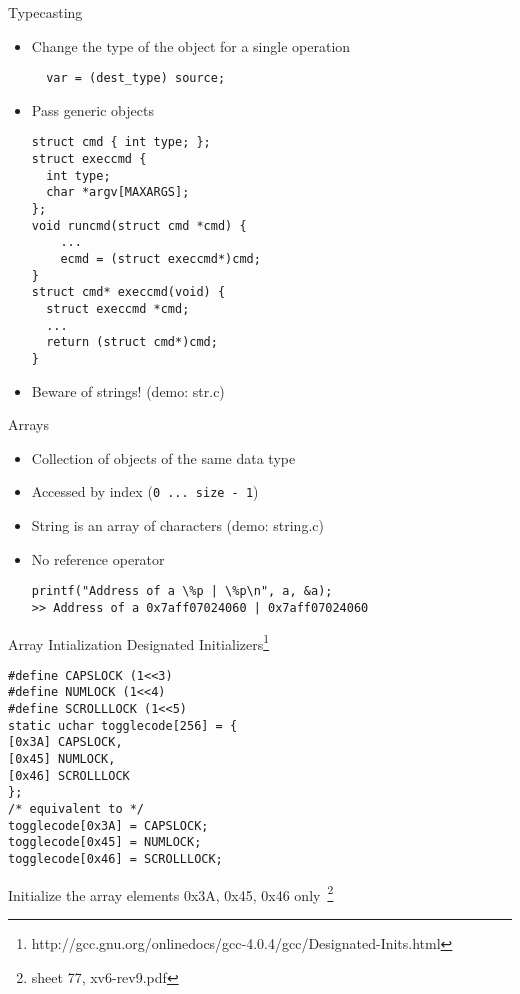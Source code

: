 \documentclass[10pt]{beamer}
\begin{document}
\begin{frame}[fragile]{Typecasting}
\begin{itemize}
\item<1-> Change the type of the object for a single operation
\begin{verbatim}
  var = (dest_type) source;
\end{verbatim}
\item<2-> Pass generic objects
\begin{verbatim}
struct cmd { int type; };
struct execcmd {
  int type;
  char *argv[MAXARGS];
};
void runcmd(struct cmd *cmd) {
    ...
    ecmd = (struct execcmd*)cmd;
}
struct cmd* execcmd(void) {
  struct execcmd *cmd;
  ...
  return (struct cmd*)cmd;
}
\end{verbatim}
\item<3-> Beware of strings! (demo: str.c)
\end{itemize}
\end{frame}

\begin{frame}[fragile]{Arrays}
\begin{itemize}
\item<1-> Collection of objects of the same data type
\item<2-> Accessed by index (\texttt{0 ... size - 1})
\item<3-> String is an array of characters (demo: string.c)
\item<4-> No reference operator
\begin{verbatim}
printf("Address of a \%p | \%p\n", a, &a);
>> Address of a 0x7aff07024060 | 0x7aff07024060
\end{verbatim}
\end{itemize}
\end{frame}

\begin{frame}[fragile]{Array Intialization}
Designated Initializers\footnote{http://gcc.gnu.org/onlinedocs/gcc-4.0.4/gcc/Designated-Inits.html}
\begin{verbatim}
#define CAPSLOCK (1<<3)
#define NUMLOCK (1<<4)
#define SCROLLLOCK (1<<5)
static uchar togglecode[256] = {
[0x3A] CAPSLOCK,
[0x45] NUMLOCK,
[0x46] SCROLLLOCK
};
/* equivalent to */
togglecode[0x3A] = CAPSLOCK;
togglecode[0x45] = NUMLOCK;
togglecode[0x46] = SCROLLLOCK;
\end{verbatim}
Initialize the array elements 0x3A, 0x45, 0x46 only~\footnote{sheet 77, xv6-rev9.pdf}
\end{frame}
\end{document}
